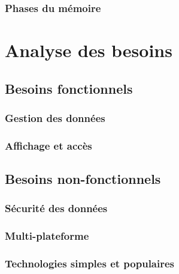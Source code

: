\documentclass{EPL-master-thesis-covers-FR}
\begin{document}

				

			\subsection*{Phases du mémoire}

			

	\chapter{Analyse des besoins}
		\label{sec:analyse_besoins}


		\section{Besoins fonctionnels}

			

			\subsection*{Gestion des données}
				\label{sec:gest_donnee}



			\subsection*{Affichage et accès}

			

		\section{Besoins non-fonctionnels}


			\subsection*{Sécurité des données}


			\subsection*{Multi-plateforme}
				

			\subsection*{Technologies simples et populaires}
\end{document}
